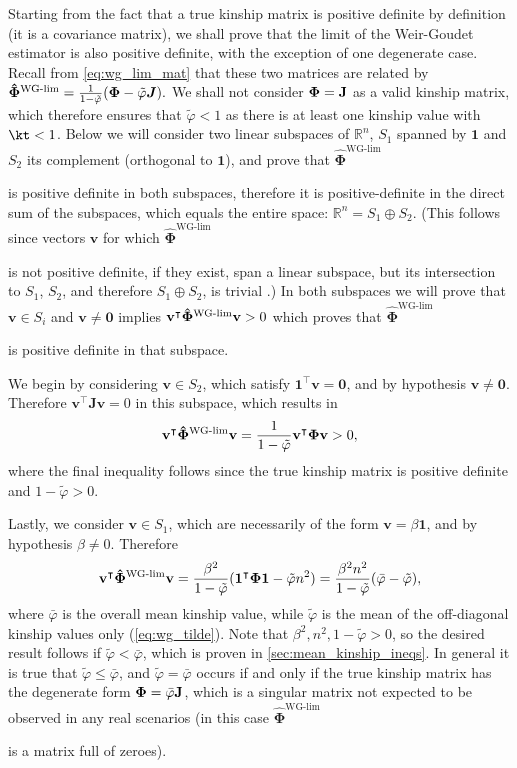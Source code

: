 \documentclass[11pt]{article}
\newcommand{\kinMat}{%
  \ensuremath{%
    \mathbf{\Phi}
  }%
  \xspace%
}%
\newcommand{\kinMatEstNamed}[1]{%
  \ensuremath{%
    \mathbf{\hat{\Phi}}^\text{#1}
  }%
  \xspace%
}%
\newcommand{\kinMatWGLim}{%
  \kinMatEstNamed{WG-lim}
}%
\begin{document}
\begin{appendices}
  Starting from the fact that a true kinship matrix is positive definite by definition (it is a covariance matrix), we shall prove that the limit of the Weir-Goudet estimator is also positive definite, with the exception of one degenerate case.
  Recall from \cref{eq:wg_lim_mat} that these two matrices are related by
  $
  \kinMatWGLim
  =
  \frac{1}{1-\tilde{\varphi}}(\kinMat-\tilde{\varphi}\boldsymbol{J})
  .
  $
  We shall not consider $\kinMat = \mathbf{J}$ as a valid kinship matrix, which therefore ensures that $\tilde{\varphi} < 1$ as there is at least one kinship value with $\kt < 1$.
  Below we will consider two linear subspaces of $\mathbb{R}^n$, $S_1$ spanned by $\mathbf{1}$ and $S_2$ its complement (orthogonal to $\mathbf{1}$), and prove that \kinMatWGLim is positive definite in both subspaces, therefore it is positive-definite in the direct sum of the subspaces, which equals the entire space: $\mathbb{R}^n = S_1 \oplus S_2$.
  (This follows since vectors $\mathbf{v}$ for which \kinMatWGLim is not positive definite, if they exist, span a linear subspace, but its intersection to $S_1$, $S_2$, and therefore $S_1 \oplus S_2$, is trivial \citep{hefferon_2020}.)
  In both subspaces we will prove that $\mathbf{v} \in S_i$ and $\mathbf{v} \ne \mathbf{0}$ implies $\mathbf{v}^\intercal \kinMatWGLim \mathbf{v} > 0$ which proves that \kinMatWGLim is positive definite in that subspace.

  We begin by considering $\mathbf{v} \in S_2$, which satisfy $\mathbf{1}^\intercal \mathbf{v} = \mathbf{0}$, and by hypothesis $\mathbf{v} \ne \mathbf{0}$.
  Therefore $\mathbf{v}^\intercal \mathbf{J} \mathbf{v} = 0$ in this subspace, which results in
  $$
  \mathbf{v}^\intercal \kinMatWGLim \mathbf{v}
  =
  \frac{1}{1-\tilde{\varphi}} \mathbf{v}^\intercal \kinMat \mathbf{v}
  >
  0
  ,
  $$
  where the final inequality follows since the true kinship matrix is positive definite and $1-\tilde{\varphi} > 0$.

  Lastly, we consider $\mathbf{v} \in S_1$, which are necessarily of the form $\mathbf{v} = \beta \mathbf{1}$, and by hypothesis $\beta \ne 0$.
  Therefore
  $$
  \mathbf{v}^\intercal \kinMatWGLim \mathbf{v}
  =
  \frac{ \beta^2 }{1-\tilde{\varphi}}(\boldsymbol{1^\intercal \kinMat 1} - \tilde{\varphi} n^2)
  =
  \frac{ \beta^2 n^2 }{1-\tilde{\varphi}}(\bar{\varphi}-\tilde{\varphi})
  ,
  $$
  where $\bar{\varphi}$ is the overall mean kinship value, while $\tilde{\varphi}$ is the mean of the off-diagonal kinship values only (\cref{eq:wg_tilde}).
  Note that $\beta^2, n^2, 1 - \tilde{\varphi} > 0$, so the desired result follows if $\tilde{\varphi} < \bar{\varphi}$, which is proven in \cref{sec:mean_kinship_ineqs}.
  In general it is true that $\tilde{\varphi} \le \bar{\varphi}$, and $\tilde{\varphi} = \bar{\varphi}$ occurs if and only if the true kinship matrix has the degenerate form $\kinMat = \bar{\varphi} \mathbf{J}$, which is a singular matrix not expected to be observed in any real scenarios (in this case \kinMatWGLim is a matrix full of zeroes).


\end{appendices}
\end{document}
